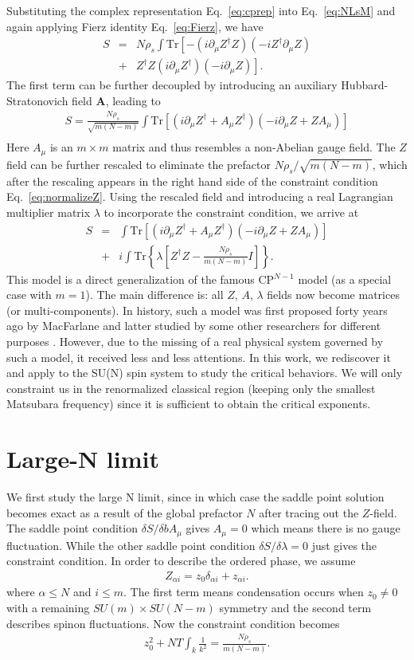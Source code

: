 \documentclass[aps,twocolumn,superscriptaddress]{revtex4-1}
\newcommand{\bea}{\begin{eqnarray}}
\newcommand{\eea}{\end{eqnarray}}
\newcommand{\bA}{\mathbf{A}}
\begin{document}
Substituting the complex representation Eq.~\ref{eq:cprep} into Eq.~\ref{eq:NLsM} and again applying Fierz identity
Eq.~\ref{eq:Fierz}, we have \bea S &=& N\rho_s \int\mathrm{Tr}\left[-(i\partial_\mu Z^\dagger Z) (-iZ^\dag \partial_\mu
Z) \right. \nonumber\\  &+& \left. Z^\dag Z (i\partial_\mu Z^\dagger)(-i\partial_\mu Z)\right] .\eea The first term can
be further decoupled by introducing an auxiliary Hubbard-Stratonovich field $\bA$, leading to \bea \label{eq:cpNm0} S=\frac{N\rho_s}{\sqrt{m(N-m)}}\int
\mathrm{Tr}\left[ (i\partial_\mu Z^\dag+A_\mu Z^\dag)(-i\partial_\mu Z+ZA_\mu)  \right] \nonumber\\ \eea Here $A_\mu$ is an $m\times
m$ matrix and thus resembles a non-Abelian gauge field. The $Z$ field can be further rescaled to eliminate the prefactor
$N\rho_s/\sqrt{m(N-m)}$, which after the rescaling appears in the right hand side of the constraint condition Eq.~\ref{eq:normalizeZ}. Using the
rescaled field and introducing a real Lagrangian multiplier matrix $\lambda$ to incorporate the constraint condition, we
arrive at \bea \label{eq:cpNm} S&=&\int \mathrm{Tr}\left[ (i\partial_\mu Z^\dag+A_\mu Z^\dag)(-i\partial_\mu Z+ZA_\mu)
\right] \nonumber \\ &+& i\int \mathrm{Tr}\left\{\lambda\left[Z^\dag Z-\frac{N\rho_s}{m(N-m)}I\right]\right\} .
\eea This model is a direct generalization of the famous CP$^{N-1}$ model (as a special case with $m=1$). The main
difference is: all $Z$, $A$, $\lambda$ fields now become matrices (or multi-components). 
In history, such a model was first proposed forty
years ago by MacFarlane \cite{macfarlane1979} and latter studied by some other researchers for different purposes
\cite{hikami1980,duerksen1981,maharana1983}. However, due to the missing of a real physical system governed by such a
model, it received less and less attentions. In this work, we rediscover it and apply to the SU(N) spin system to study
the critical behaviors. We will only constraint us in the renormalized classical region (keeping only the smallest Matsubara
frequency) since it is sufficient to obtain the critical exponents. \cite{irkhin1996}

\section{Large-N limit}
We first study the large N limit, since in which case the saddle point solution becomes exact as a result of the global
prefactor $N$ after tracing out the $Z$-field. The saddle point condition $\delta S/\delta bA_\mu$ gives $A_\mu=0$ which
means there is no gauge fluctuation. While the other saddle point condition $\delta S/\delta \lambda=0$ just gives the
constraint condition. In order to describe the ordered phase, we assume \bea Z_{\alpha i}=z_0\delta_{\alpha i}+z_{\alpha
i}. \eea where $\alpha\le N$ and $i\le m$. The first term means condensation occurs when $z_0\ne0$ with a remaining
$SU(m)\times SU(N-m)$ symmetry and the second term describes spinon fluctuations. Now the constraint condition becomes
\bea \label{eq:Ninfty} z_0^2 + NT\int_k \frac{1}{k^2} = \frac{N\rho_s}{{m(N-m)}}. \eea 
\end{document}
